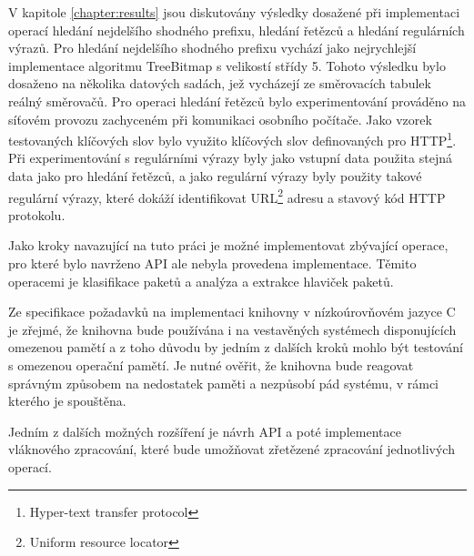 V kapitole \ref{chapter:results} jsou diskutovány výsledky dosažené
při implementaci operací hledání nejdelšího shodného prefixu, hledání řetězců a hledání regulárních
výrazů. Pro hledání nejdelšího shodného prefixu vychází jako nejrychlejší implementace algoritmu
TreeBitmap s velikostí střídy 5. Tohoto výsledku bylo dosaženo na několika datových sadách,
jež vycházejí ze směrovacích tabulek reálný směrovačů.
Pro operaci hledání řetězců bylo experimentování prováděno na síťovém provozu zachyceném
při komunikaci osobního počítače. Jako vzorek
testovaných klíčových slov bylo využito klíčových slov definovaných pro HTTP\footnote{Hyper-text transfer protocol}.
Při experimentování s regulárními výrazy byly jako vstupní data použita stejná data jako pro hledání řetězců,
a jako regulární výrazy byly použity takové regulární výrazy, které dokáží identifikovat URL\footnote{Uniform resource locator} adresu a stavový kód HTTP protokolu.

Jako kroky navazující na tuto práci je možné implementovat zbývající operace, pro které bylo navrženo API ale nebyla provedena implementace. Těmito operacemi je klasifikace paketů a analýza a extrakce hlaviček paketů.

Ze specifikace požadavků na implementaci knihovny v nízkoúrovňovém jazyce C je zřejmé,
že knihovna bude používána i na vestavěných systémech disponujících omezenou pamětí a z toho
důvodu by jedním z dalších kroků mohlo být testování s omezenou operační pamětí.
Je nutné ověřit, že knihovna bude reagovat správným způsobem na nedostatek paměti a nezpůsobí pád systému,
v rámci kterého je spouštěna.

Jedním z dalších možných rozšíření je návrh API a poté implementace vláknového zpracování, které bude
umožňovat zřetězené zpracování jednotlivých operací.
